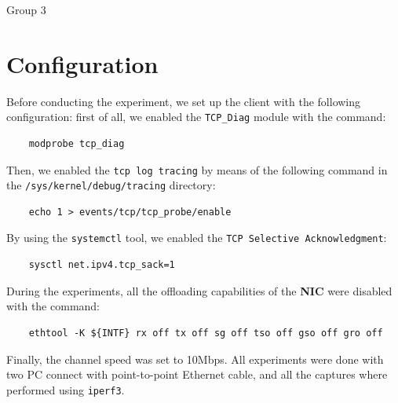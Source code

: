 \documentclass{exam}
\begin{document}
\newcommand{\LoggaEng}{
	\textsc{\Huge Uppsala University}\\[0.7cm]
	\texttt{[image: Uppsala\_University\_seal\_svg.png]}\\[0.5cm]
}

\begin{titlepage}

	\center


	\LoggaSwe


	\Large Group 3\\

	\vfill

\end{titlepage}
\pagebreak

\section{Configuration}
Before conducting the experiment, we set up the client with the following configuration: first of all, we enabled the \verb|TCP_Diag| module with the command:
\begin{lstlisting}
    modprobe tcp_diag
\end{lstlisting}
Then, we enabled the \verb|tcp log tracing| by means of the following command in the \verb|/sys/kernel/debug/tracing| directory:
\begin{lstlisting}
    echo 1 > events/tcp/tcp_probe/enable
\end{lstlisting}
By using the \verb|systemctl| tool, we enabled the \verb|TCP Selective Acknowledgment|:
\begin{lstlisting}
    sysctl net.ipv4.tcp_sack=1
\end{lstlisting}
During the experiments, all the offloading capabilities of the \textbf{NIC} were disabled with the command:
\begin{lstlisting}
    ethtool -K ${INTF} rx off tx off sg off tso off gso off gro off
\end{lstlisting}
Finally, the channel speed was set to 10Mbps. All experiments were done with two PC connect with point-to-point Ethernet cable, and all the captures where performed using \texttt{iperf3}.
\end{document}
